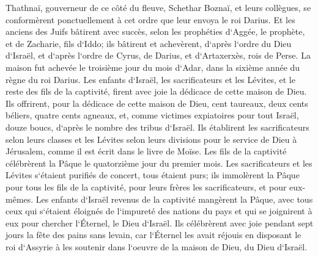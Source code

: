\verse Thathnaï, gouverneur de ce côté du fleuve, Schethar Boznaï, et leurs collègues, se conformèrent ponctuellement à cet ordre que leur envoya le roi Darius. 
\verse Et les anciens des Juifs bâtirent avec succès, selon les prophéties d`Aggée, le prophète, et de Zacharie, fils d`Iddo; ils bâtirent et achevèrent, d`après l`ordre du Dieu d`Israël, et d`après l`ordre de Cyrus, de Darius, et d`Artaxerxès, rois de Perse. 
\verse La maison fut achevée le troisième jour du mois d`Adar, dans la sixième année du règne du roi Darius. 
\verse Les enfants d`Israël, les sacrificateurs et les Lévites, et le reste des fils de la captivité, firent avec joie la dédicace de cette maison de Dieu. 
\verse Ils offrirent, pour la dédicace de cette maison de Dieu, cent taureaux, deux cents béliers, quatre cents agneaux, et, comme victimes expiatoires pour tout Israël, douze boucs, d`après le nombre des tribus d`Israël. 
\verse Ils établirent les sacrificateurs selon leurs classes et les Lévites selon leurs divisions pour le service de Dieu à Jérusalem, comme il est écrit dans le livre de Moïse. 
\verse Les fils de la captivité célébrèrent la Pâque le quatorzième jour du premier mois. 
\verse Les sacrificateurs et les Lévites s`étaient purifiés de concert, tous étaient purs; ils immolèrent la Pâque pour tous les fils de la captivité, pour leurs frères les sacrificateurs, et pour eux-mêmes. 
\verse Les enfants d`Israël revenus de la captivité mangèrent la Pâque, avec tous ceux qui s`étaient éloignés de l`impureté des nations du pays et qui se joignirent à eux pour chercher l`Éternel, le Dieu d`Israël. 
\verse Ils célébrèrent avec joie pendant sept jours la fête des pains sans levain, car l`Éternel les avait réjouis en disposant le roi d`Assyrie à les soutenir dans l`oeuvre de la maison de Dieu, du Dieu d`Israël. 

\chapter{}

